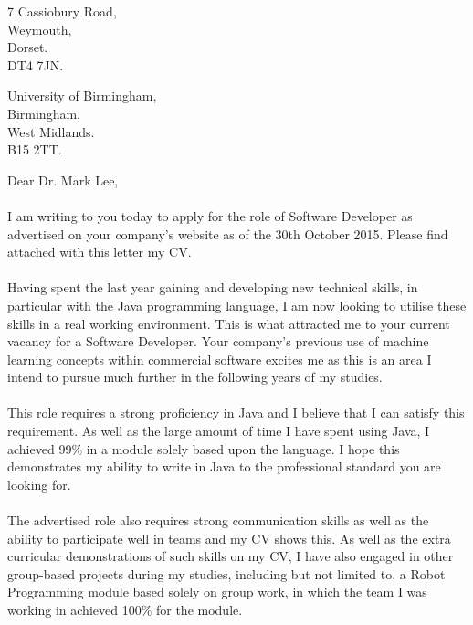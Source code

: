 \documentclass[12pt]{article}
\begin{document}

	\begin{flushright}
		7 Cassiobury Road,\\
		Weymouth,\\
		Dorset.\\
		DT4 7JN.
	\end{flushright}

	\begin{flushleft}
		University of Birmingham,\\
		Birmingham,\\
		West Midlands.\\
		B15 2TT.
	\end{flushleft}

	\begin{flushleft}
		Dear Dr. Mark Lee, 
		\paragraph{}
			I am writing to you today to apply for the role of Software Developer as advertised on your company's website as of the 30th October 2015. Please find attached with this letter my CV.
	
		\paragraph{}
			Having spent the last year gaining and developing new technical skills, in particular with the Java programming language, I am now looking to utilise these skills in a real working environment. This is what attracted me to your current vacancy for a Software Developer. Your company's previous use of machine learning concepts within commercial software excites me as this is an area I intend to pursue much further in the following years of my studies.

		\paragraph{}
			This role requires a strong proficiency in Java and I believe that I can satisfy this requirement. As well as the large amount of time I have spent using Java, I achieved 99\% in a module solely based upon the language. I hope this demonstrates my ability to write in Java to the professional standard you are looking for.

		\paragraph{}
			The advertised role also requires strong communication skills as well as the ability to participate well in teams and my CV shows this. As well as the extra curricular demonstrations of such skills on my CV, I have also engaged in other group-based projects during my studies, including but not limited to, a Robot Programming module based solely on group work, in which the team I was working in achieved 100\% for the module.


\end{flushleft}
\end{document}
